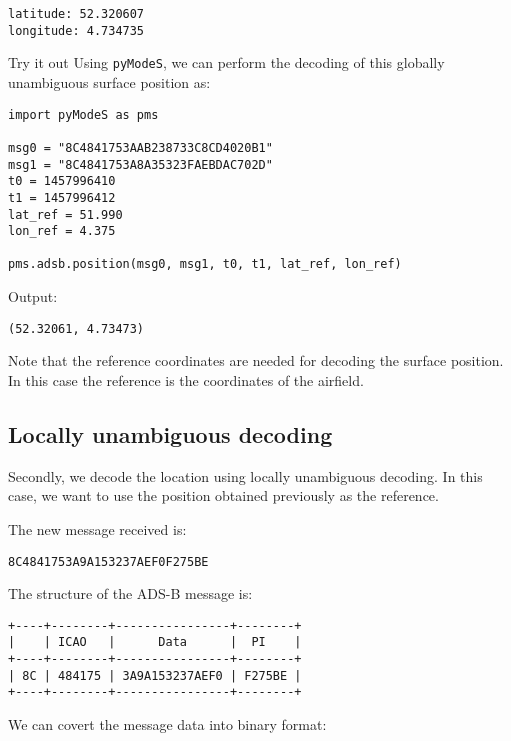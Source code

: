 \begin{verbatim}
latitude: 52.320607
longitude: 4.734735
\end{verbatim}

\begin{notebox}{Try it out}
Using \texttt{pyModeS}, we can perform the decoding of this globally unambiguous surface position as: 

\begin{verbatim}
import pyModeS as pms

msg0 = "8C4841753AAB238733C8CD4020B1"
msg1 = "8C4841753A8A35323FAEBDAC702D"
t0 = 1457996410
t1 = 1457996412
lat_ref = 51.990
lon_ref = 4.375

pms.adsb.position(msg0, msg1, t0, t1, lat_ref, lon_ref)
\end{verbatim}

Output: 

\begin{verbatim}
(52.32061, 4.73473)
\end{verbatim}

Note that the reference coordinates are needed for decoding the surface position. In this case the reference is the coordinates of the airfield. 

\end{notebox}



\subsection{Locally unambiguous decoding}

Secondly, we decode the location using locally unambiguous decoding. In this case, we want to use the position obtained previously as the reference.

The new message received is:

\begin{verbatim}
8C4841753A9A153237AEF0F275BE
\end{verbatim}

The structure of the ADS-B message is:

\begin{verbatim}
+----+--------+----------------+--------+
|    | ICAO   |      Data      |  PI    |
+----+--------+----------------+--------+
| 8C | 484175 | 3A9A153237AEF0 | F275BE |
+----+--------+----------------+--------+
\end{verbatim}

We can covert the message data into binary format:

